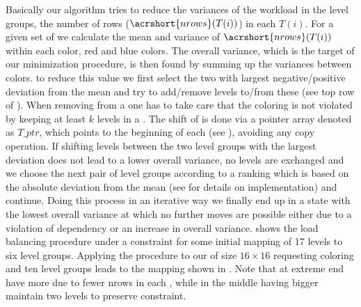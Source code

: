 Basically our algorithm tries to reduce the variances of the workload in the level groups, \ie the number of rows ($\acrshort{nrows}(T(i))$) in each \levelGroup $T(i)$. For a given set of \levelGroups we calculate the mean and variance of $\acrshort{nrows}(T(i))$ within each color, \ie red and blue colors.  
The overall variance, which is the target of our minimization procedure, is then found by summing up the variances between colors. \Inorder to reduce this value we first select the two \levelGroups with largest negative/positive deviation from the mean  and try to add/remove levels to/from these \levelGroups (see top row of ). When removing \levels from a \levelGroup one has to take care that the \DK coloring is not violated by keeping at least $k$ levels in a \levelGroup. The shift of \levels is done via a pointer array denoted as $T\_ptr$, which points to the beginning of each \levelGroup (see ), avoiding any copy operation. If shifting levels between the two level groups with the largest deviation does not lead to a lower overall variance, no levels are exchanged and we choose the next pair of level groups according to a ranking which is based on the absolute deviation from the mean (see  for details on implementation) and continue. Doing this process in an iterative way we finally end up in a state with the lowest overall variance at which no further moves are possible either due to a violation of \DK dependency or an increase in overall variance.  shows the load balancing procedure under a \DTWO constraint for some initial mapping of 17 levels to six level groups. Applying the procedure to our  \stex of size $16 \times 16$  requesting \DTWO coloring and ten level groups leads to the mapping shown in . Note that \levelGroups at extreme end have more \levels due to fewer \acrshort{nrows} in each \level, while \levelGroups in the middle having bigger \levels maintain two levels to preserve \DTWO constraint.
  
